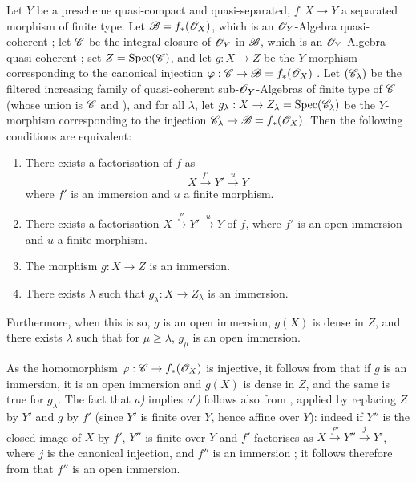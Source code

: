 \begin{proposition}[8.12.3]
\label{IV.8.12.3}
Let $Y$ be a prescheme quasi-compact and quasi-separated, $f:X\to Y$ a separated morphism of finite type.
Let $\mathscr{B}=f_*(\mathscr{O}_X)$, which is an $\mathscr{O}_Y$-Algebra quasi-coherent ; let $\mathscr{C}$ be the integral closure of $\mathscr{O}_Y$ in $\mathscr{B}$, which is an $\mathscr{O}_Y$-Algebra quasi-coherent ; set $Z=\operatorname{Spec}(\mathscr{C})$, and let $g:X\to Z$ be the $Y$-morphism corresponding to the canonical injection $\varphi:\mathscr{C}\to\mathscr{B}=f_*(\mathscr{O}_X)$ . Let $(\mathscr{C}_\lambda)$ be the filtered increasing family of quasi-coherent sub-$\mathscr{O}_Y$-Algebras of finite type of $\mathscr{C}$ (whose union is $\mathscr{C}$  and ), and for all $\lambda$, let $g_\lambda:X\to Z_\lambda=\operatorname{Spec}(\mathscr{C}_\lambda)$ be the $Y$-morphism corresponding to the injection $\mathscr{C}_\lambda\to\mathscr{B}=f_*(\mathscr{O}_X)$.
Then the following conditions are equivalent:
\begin{enumerate}[label=\emph{\alph*)}]
  \item[\emph{a)}] There exists a factorisation of $f$ as
\[
X\xrightarrow{f'}Y'\xrightarrow{u}Y
\]
where $f'$ is an immersion and $u$ a finite morphism.
  \item[\emph{a$'$)}] There exists a factorisation $X\xrightarrow{f'}Y'\xrightarrow{u}Y$ of $f$, where $f'$ is an open immersion and $u$ a finite morphism.
  \item[\emph{b)}] The morphism $g:X\to Z$ is an immersion.
  \item[\emph{c)}] There exists $\lambda$ such that $g_\lambda:X\to Z_\lambda$ is an immersion.
\end{enumerate}
Furthermore, when this is so, $g$ is an open immersion, $g(X)$ is dense in $Z$, and there exists $\lambda$ such that for $\mu\geqslant\lambda$, $g_\mu$ is an open immersion.
\end{proposition}

As the homomorphism $\varphi:\mathscr{C}\to f_*(\mathscr{O}_X)$ is injective, it follows from  that if $g$ is an immersion, it is an open immersion and $g(X)$ is dense in $Z$, and the same is true for $g_\lambda$.
The fact that \emph{a)} implies \emph{a$'$)} follows also from , applied by replacing $Z$ by $Y'$ and $g$ by $f'$ (since $Y'$ is finite over $Y$, hence affine over $Y$): indeed if $Y''$ is the closed image of $X$ by $f'$, $Y''$ is finite over $Y$ and $f'$ factorises as $X\xrightarrow{f''}Y''\xrightarrow{j}Y'$, where $j$ is the canonical injection, and $f''$ is an immersion ; it follows therefore from  that $f''$ is an open immersion.

